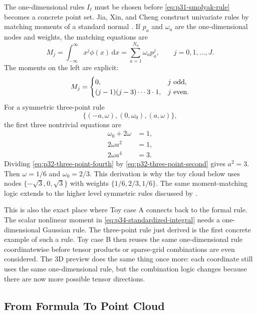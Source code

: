 \documentclass[11pt]{article}
\numberwithin{equation}{section}
\newcommand{\dd}{\,\mathrm d}
\begin{document}
The one-dimensional rules \(I_\ell\) must be chosen before
\eqref{eq:p31-smolyak-rule} becomes a concrete point set.  Jia, Xin, and Cheng
construct univariate rules by matching moments of a standard normal
\cite[Section 3.2]{jia2012sparsegrid}.  If \(p_a\) and \(\omega_a\) are the
one-dimensional nodes and weights, the matching equations are
\begin{equation}
  M_j
  =
  \int_{-\infty}^{\infty}x^j\phi(x)\dd x
  =
  \sum_{a=1}^{N_u}\omega_a p_a^j,
  \qquad j=0,1,\ldots,J.
  \label{eq:p32-univariate-moment-match}
\end{equation}
The moments on the left are explicit:
\begin{equation}
  M_j=
  \begin{cases}
  0, & j\ \hbox{odd},\\
  (j-1)(j-3)\cdots 3\cdot 1, & j\ \hbox{even}.
  \end{cases}
  \label{eq:p32-normal-moments}
\end{equation}
For a symmetric three-point rule
\[
  \{(-a,\omega),(0,\omega_0),(a,\omega)\},
\]
the first three nontrivial equations are
\begin{align}
  \omega_0+2\omega&=1,
  \label{eq:p32-three-point-mass}\\
  2\omega a^2&=1,
  \label{eq:p32-three-point-second}\\
  2\omega a^4&=3.
  \label{eq:p32-three-point-fourth}
\end{align}
Dividing \eqref{eq:p32-three-point-fourth} by
\eqref{eq:p32-three-point-second} gives \(a^2=3\).  Then
\(\omega=1/6\) and \(\omega_0=2/3\).  This derivation is why the toy cloud
below uses nodes \(\{-\sqrt3,0,\sqrt3\}\) with weights
\(\{1/6,2/3,1/6\}\).  The same moment-matching logic extends to the higher
level symmetric rules discussed by \citet[Section 3.2]{jia2012sparsegrid}.

This is also the exact place where Toy case A connects back to the formal rule.
The scalar nonlinear moment in \eqref{eq:p34-standardized-integral} needs a
one-dimensional Gaussian rule.  The three-point rule just derived is the first
concrete example of such a rule.  Toy case B then reuses the same one-dimensional
rule coordinatewise before tensor products or sparse-grid combinations are even
considered.  The 3D preview does the same thing once more: each coordinate still
uses the same one-dimensional rule, but the combination logic changes because
there are now more possible tensor directions.

\subsection{From Formula To Point Cloud}
\label{subsec:p32-cloud-construction}
\end{document}
